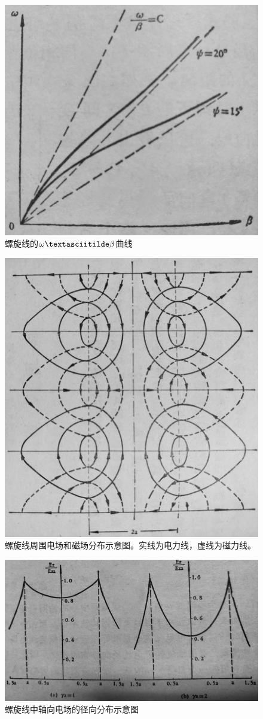 \begin{figure}[phtb]
	\centering
	\includegraphics[width=0.65\linewidth]{figure/ch3-4}
	\caption{螺旋线的$ \omega \textasciitilde \beta $曲线}
	\label{ch3-4}
\end{figure}


\begin{figure}[phtb]
	\centering
	\includegraphics[width=0.65\linewidth]{figure/ch3-5}
	\caption{螺旋线周围电场和磁场分布示意图。实线为电力线，虚线为磁力线。}
	\label{ch3-5}
\end{figure}

\begin{figure}[phtb]
	\centering
	\includegraphics[width=0.65\linewidth]{figure/ch3-6}
	\caption{螺旋线中轴向电场的径向分布示意图}
	\label{ch3-6}
\end{figure}

